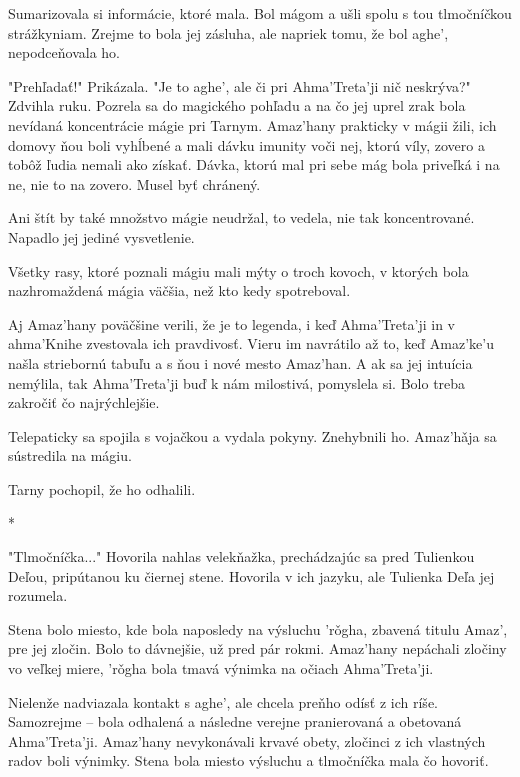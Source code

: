 \documentclass{book}
\begin{document}
Sumarizovala si informácie, ktoré mala. Bol mágom a ušli spolu s tou tlmočníčkou strážkyniam. Zrejme to bola jej zásluha, ale napriek tomu, že bol aghe', nepodceňovala ho.

"$ $Prehľadať!"$ $ Prikázala. "$ $Je to aghe', ale či pri Ahma'Treta'ji nič neskrýva?"$ $ Zdvihla ruku. Pozrela sa do magického pohľadu a na čo jej uprel zrak bola nevídaná koncentrácie mágie pri Tarnym. Amaz'hany prakticky v mágii žili, ich domovy ňou boli vyhĺbené a mali dávku imunity voči nej, ktorú víly, zovero a tobôž ľudia nemali ako získať. Dávka, ktorú mal pri sebe mág bola priveľká i na ne, nie to na zovero. Musel byť chránený.

Ani štít by také množstvo mágie neudržal, to vedela, nie tak koncentrované. Napadlo jej jediné vysvetlenie.

Všetky rasy, ktoré poznali mágiu mali mýty o troch kovoch, v ktorých bola nazhromaždená mágia väčšia, než kto kedy spotreboval.

Aj Amaz'hany poväčšine verili, že je to legenda, i keď Ahma'Treta'ji in v ahma'Knihe zvestovala ich pravdivosť. Vieru im navrátilo až to, keď Amaz'ke'u našla striebornú tabuľu a s ňou i nové mesto Amaz'han. A ak sa jej intuícia nemýlila, tak Ahma'Treta'ji buď k nám milostivá, pomyslela si. Bolo treba zakročiť čo najrýchlejšie.

Telepaticky sa spojila s vojačkou a vydala pokyny. Znehybnili ho. Amaz'ha\v{}ja sa sústredila na mágiu.

Tarny pochopil, že ho odhalili.

\begin{center}
*
\end{center}

"$ $Tlmočníčka..."$ $ Hovorila nahlas velekňažka, prechádzajúc sa pred Tulienkou Deľou, pripútanou ku čiernej stene. Hovorila v ich jazyku, ale Tulienka Deľa jej rozumela.

Stena bolo miesto, kde bola naposledy na výsluchu 'ro\v{}gha, zbavená titulu Amaz', pre jej zločin. Bolo to dávnejšie, už pred pár rokmi. Amaz'hany nepáchali zločiny vo veľkej miere, 'ro\v{}gha bola tmavá výnimka na očiach Ahma'Treta'ji.

Nielenže nadviazala kontakt s aghe', ale chcela preňho odísť z ich ríše. Samozrejme – bola odhalená a následne verejne pranierovaná a obetovaná Ahma'Treta'ji. Amaz'hany nevykonávali krvavé obety, zločinci z ich vlastných radov boli výnimky. Stena bola miesto výsluchu a tlmočníčka mala čo hovoriť.
\end{document}
